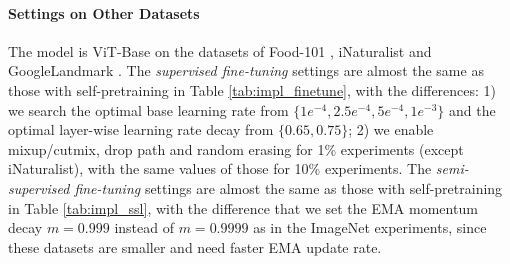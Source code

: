 \documentclass{article}
\begin{document}
\paragraph{Settings on Other Datasets}
The model is ViT-Base on the datasets of Food-101 \cite{DBLP:conf/eccv/BossardGG14}, iNaturalist \cite{DBLP:journals/corr/HornASSAPB17} and GoogleLandmark \cite{DBLP:conf/iccv/NohASWH17}. The \emph{supervised fine-tuning} settings are almost the same as those with self-pretraining in Table \ref{tab:impl_finetune}, with the differences: 1) we search the optimal base learning rate from $\{1e^{-4}, 2.5e^{-4}, 5e^{-4}, 1e^{-3}\}$ and the optimal layer-wise learning rate decay from $\{0.65, 0.75\}$; 2) we enable mixup/cutmix, drop path and random erasing for 1\% experiments (except iNaturalist), with the same values of those for 10\% experiments. The \emph{semi-supervised fine-tuning} settings are almost the same as those with self-pretraining in Table \ref{tab:impl_ssl}, with the difference that we set the EMA momentum decay $m=0.999$ instead of $m=0.9999$ as in the ImageNet experiments, since these datasets are smaller and need faster EMA update rate.

 
\end{document}

